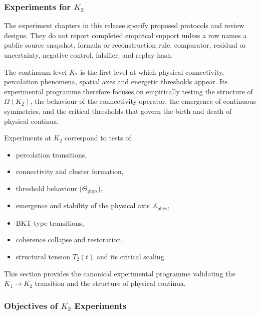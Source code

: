 
\subsubsection{Experiments for \texorpdfstring{$K_2$}{K_2}}

The experiment chapters in this release specify proposed protocols and review designs. They do not report completed empirical support unless a row names a public source snapshot, formula or reconstruction rule, comparator, residual or uncertainty, negative control, falsifier, and replay hash.
\label{sec:experiments-k2}

The continuum level $K_2$ is the first level at which physical connectivity,
percolation phenomena, spatial axes and energetic thresholds appear.
Its experimental programme therefore focuses on empirically testing the
structure of $\Omega(K_2)$, the behaviour of the connectivity operator,
the emergence of continuous symmetries, and the critical thresholds that
govern the birth and death of physical continua.

Experiments at $K_2$ correspond to tests of:
\begin{itemize}
    \item percolation transitions,
    \item connectivity and cluster formation,
    \item threshold behaviour ($\Theta_{\mathrm{phys}}$),
    \item emergence and stability of the physical axis $A_{\mathrm{phys}}$,
    \item BKT-type transitions,
    \item coherence collapse and restoration,
    \item structural tension $T_2(t)$ and its critical scaling.
\end{itemize}

This section provides the canonical experimental programme validating the
$K_1 \rightarrow K_2$ transition and the structure of physical continua.



\subsubsection{Objectives of \texorpdfstring{$K_2$}{K_2} Experiments}

